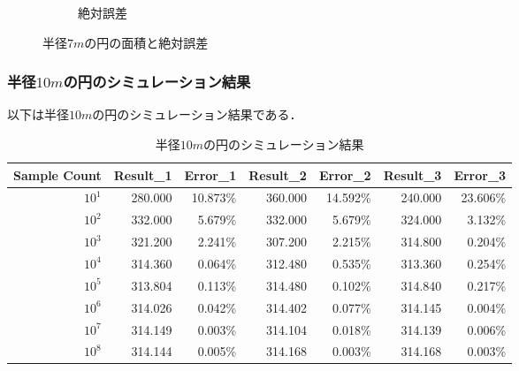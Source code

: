 \documentclass[a4j, titlepage]{jarticle}
\begin{document}
\begin{figure}[htb]
\begin{subfigure}[b]{0.38\textwidth}
            \caption{絶対誤差}
            \label{fig:errarea7}
          \end{subfigure}
          \hfill
              \caption{半径$7m$の円の面積と絶対誤差}
              \label{fig:resarea7}
        \end{figure}

      \vspace{20pt}
      \subsubsection{半径$10m$の円のシミュレーション結果}
        以下は半径$10m$の円のシミュレーション結果である．

        \begin{longtable}[c]{|r|r|r|r|r|r|r|}
          \caption{半径$10m$の円のシミュレーション結果}
          \label{tab:area10}\\
          \hline
          \rowcolor[HTML]{C0C0C0} 
          Sample Count   & Result\_1 & Error\_1 & Result\_2 & Error\_2 & Result\_3 & Error\_3 \\ \hline
          \endfirsthead
          \endhead
          $10^1$  & 280.000   & 10.873\% & 360.000   & 14.592\% & 240.000   & 23.606\% \\ \hline
          $10^2$  & 332.000   & 5.679\%  & 332.000   & 5.679\%  & 324.000   & 3.132\%  \\ \hline
          $10^3$  & 321.200   & 2.241\%  & 307.200   & 2.215\%  & 314.800   & 0.204\%  \\ \hline
          $10^4$  & 314.360   & 0.064\%  & 312.480   & 0.535\%  & 313.360   & 0.254\%  \\ \hline
          $10^5$  & 313.804   & 0.113\%  & 314.480   & 0.102\%  & 314.840   & 0.217\%  \\ \hline
          $10^6$  & 314.026   & 0.042\%  & 314.402   & 0.077\%  & 314.145   & 0.004\%  \\ \hline
          $10^7$  & 314.149   & 0.003\%  & 314.104   & 0.018\%  & 314.139   & 0.006\%  \\ \hline
          $10^8$  & 314.144   & 0.005\%  & 314.168   & 0.003\%  & 314.168   & 0.003\%  \\ \hline
        \end{longtable}
\end{document}

